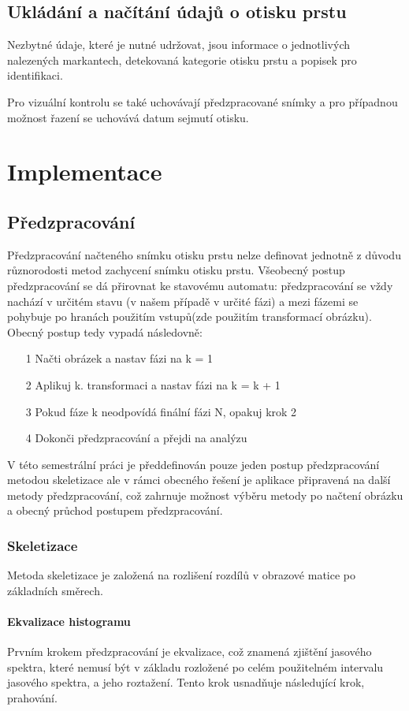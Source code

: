 \documentclass[12pt,a4paper]{article}
\let\oldsection\section
\renewcommand\section{\clearpage\oldsection}
\begin{document}
\subsection{Ukládání a načítání údajů o otisku prstu}
Nezbytné údaje, které je nutné udržovat, jsou informace o jednotlivých nalezených markantech, detekovaná kategorie otisku prstu a popisek pro identifikaci.

Pro vizuální kontrolu se také uchovávají předzpracované snímky a pro případnou možnost řazení se uchovává datum sejmutí otisku.

\section{Implementace}
\subsection{Předzpracování}
Předzpracování načteného snímku otisku prstu nelze definovat jednotně z důvodu různorodosti metod zachycení snímku otisku prstu. Všeobecný postup předzpracování se dá přirovnat ke stavovému automatu: předzpracování se vždy nachází v určitém stavu (v našem případě v určité fázi) a mezi fázemi se pohybuje po hranách použitím vstupů(zde použitím transformací obrázku). Obecný postup tedy vypadá následovně:
\begin{enumerate}
\item[1] Načti obrázek a nastav fázi na k = 1
\item[2] Aplikuj k. transformaci a nastav fázi na k = k + 1
\item[3] Pokud fáze k neodpovídá finální fázi N, opakuj krok 2
\item[4] Dokonči předzpracování a přejdi na analýzu
\end{enumerate}
V této semestrální práci je předdefinován pouze jeden postup předzpracování metodou skeletizace ale v rámci obecného řešení je aplikace připravená na další metody předzpracování, což zahrnuje možnost výběru metody po načtení obrázku a obecný průchod postupem předzpracování.

\subsubsection{Skeletizace}
Metoda skeletizace je založená na rozlišení rozdílů v obrazové matice po základních směrech.
\paragraph{Ekvalizace histogramu}
Prvním krokem předzpracování je ekvalizace, což znamená zjištění jasového spektra, které nemusí být v základu rozložené po celém použitelném intervalu jasového spektra, a jeho roztažení. Tento krok usnadňuje následující krok, prahování.
\end{document}

